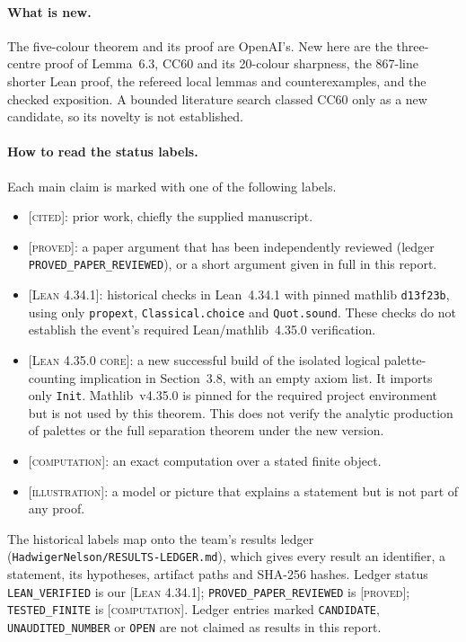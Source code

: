 \documentclass[11pt]{article}
\theoremstyle{definition}
\theoremstyle{remark}
\newcommand{\st}[1]{\textsc{[#1]}}
\begin{document}
\paragraph{What is new.} The five-colour theorem and its proof are OpenAI's. New here are the three-centre proof of Lemma~6.3, CC60 and its 20-colour sharpness, the 867-line shorter Lean proof, the refereed local lemmas and counterexamples, and the checked exposition. A bounded literature search classed CC60 only as a new candidate, so its novelty is not established.

\paragraph{How to read the status labels.}
Each main claim is marked with one of the following labels.
\begin{itemize}
\item \st{cited}: prior work, chiefly the supplied manuscript.
\item \st{proved}: a paper argument that has been independently reviewed (ledger \texttt{PROVED\_\allowbreak{}PAPER\_\allowbreak{}REVIEWED}), or a short argument given in full in this report.
\item \st{Lean 4.34.1}: historical checks in Lean~4.34.1 with pinned mathlib
\texttt{d13f23b}, using only \texttt{propext}, \texttt{Classical.\allowbreak{}choice}
and \texttt{Quot.sound}. These checks do not establish the event's required
Lean/mathlib~4.35.0 verification.
\item \st{Lean 4.35.0 core}: a new successful build of the isolated logical
palette-counting implication in Section~3.8, with an empty axiom list. It
imports only \texttt{Init}. Mathlib~v4.35.0 is pinned for the required project
environment but is not used by this theorem. This does not verify the analytic
production of palettes or the full separation theorem under the new version.
\item \st{computation}: an exact computation over a stated finite object.
\item \st{illustration}: a model or picture that explains a statement but is not part of any proof.
\end{itemize}
The historical labels map onto the team's results ledger (\texttt{Hadwiger\allowbreak{}Nelson/\allowbreak{}RESULTS-\allowbreak{}LEDGER.\allowbreak{}md}), which gives every result an identifier, a statement, its hypotheses, artifact paths and SHA-256 hashes. Ledger status \texttt{LEAN\_\allowbreak{}VERIFIED} is our \st{Lean 4.34.1}; \texttt{PROVED\_\allowbreak{}PAPER\_\allowbreak{}REVIEWED} is \st{proved}; \texttt{TESTED\_\allowbreak{}FINITE} is \st{computation}. Ledger entries marked \texttt{CANDIDATE}, \texttt{UNAUDITED\_\allowbreak{}NUMBER} or \texttt{OPEN} are not claimed as results in this report.
\end{document}
